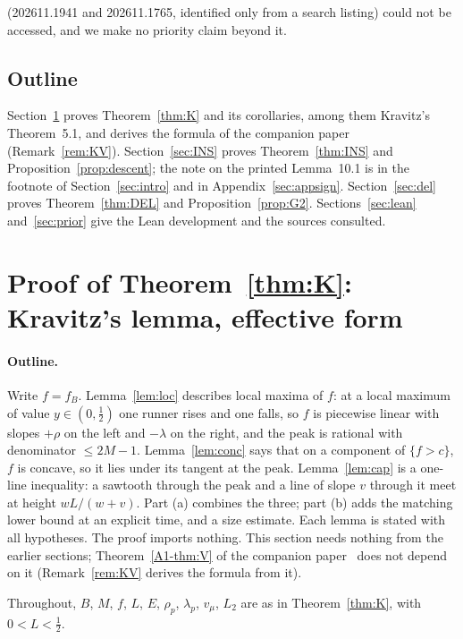 \documentclass[11pt]{article}
\theoremstyle{definition}
\theoremstyle{remark}
\newcommand{\xA}[1]{\ref{A1-#1}}
\begin{document}
(202611.1941 and 202611.1765, identified only from a search listing) could not be accessed, and we make no priority claim beyond it.

\subsection{Outline}
Section~\ref{sec:K} proves Theorem~\ref{thm:K} and its corollaries, among them Kravitz's Theorem~5.1, and derives the formula of the companion paper (Remark~\ref{rem:KV}). Section~\ref{sec:INS} proves Theorem~\ref{thm:INS} and Proposition~\ref{prop:descent}; the note on the printed Lemma~10.1 is in the footnote of Section~\ref{sec:intro} and in Appendix~\ref{sec:appsign}. Section~\ref{sec:del} proves Theorem~\ref{thm:DEL} and Proposition~\ref{prop:G2}. Sections~\ref{sec:lean} and~\ref{sec:prior} give the Lean development and the sources consulted.


\section{Proof of Theorem~\ref{thm:K}: Kravitz's lemma, effective form}\label{sec:K}

\paragraph{Outline.}
Write $f=f_B$. Lemma~\ref{lem:loc} describes local maxima of $f$: at a local maximum of value $y\in(0,\frac12)$ one runner rises and one falls, so $f$ is piecewise linear with slopes $+\rho$ on the left and $-\lambda$ on the right, and the peak is rational with denominator $\le2M-1$. Lemma~\ref{lem:conc} says that on a component of $\{f>c\}$, $f$ is concave, so it lies under its tangent at the peak. Lemma~\ref{lem:cap} is a one-line inequality: a sawtooth through the peak and a line of slope $v$ through it meet at height $wL/(w+v)$. Part (a) combines the three; part (b) adds the matching lower bound at an explicit time, and a size estimate. Each lemma is stated with all hypotheses. The proof imports nothing. This section needs nothing from the earlier sections; Theorem~\xA{thm:V} of the companion paper~\cite{A1} does not depend on it (Remark~\ref{rem:KV} derives the formula from it).

Throughout, $B$, $M$, $f$, $L$, $E$, $\rho_p$, $\lambda_p$, $v_\mu$, $L_2$ are as in Theorem~\ref{thm:K}, with $0<L<\frac12$.
\end{document}
